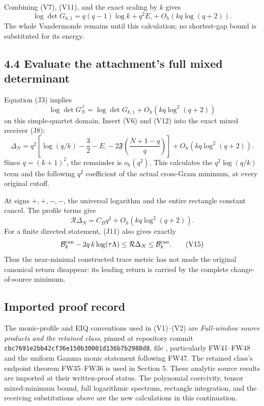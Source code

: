 \documentclass[11pt]{article}
\begin{document}
Combining (V7), (V11), and the exact scaling by \(k\) gives \[
 \log\det G_{k,1}
 =q(q-1)\log k+q^2E_\square+O_h(kq\log(q+2)). \tag{V12}
\] The whole Vandermonde remains until this calculation; no shortest-gap bound is substituted for its energy.

\subsection{4.4 Evaluate the attachment's full mixed determinant}\label{evaluate-the-attachments-full-mixed-determinant}

Equation (J3) implies \[
 \log\det G_N^J
 =\log\det G_{k,1}+O_h(kq\log^2(q+2))
\] on this simple-quartet domain. Insert (V6) and (V12) into the exact mixed receiver (J8): \[
 \boxed{
 \Delta_N
 =q^2\left[
 \log(q/k)-\frac32-E_\square
 -2\mathfrak F\!\left(\frac{N+1-q}{q}\right)
 \right]
 +O_h(kq\log^2(q+2)).
 } \tag{V13}
\] Since \(q=(k+1)^2\), the remainder is \(o_h(q^2)\). This calculates the \(q^2\log(q/k)\) term and the following \(q^2\) coefficient of the actual cross-Gram minimum, at every original cutoff.

At signs \(+,+,-,-\), the universal logarithm and the entire rectangle constant cancel. The profile terms give \[
 \boxed{\mathcal R\Delta_N
 =C_Bq^2+O_h(kq\log^2(q+2)).} \tag{V14}
\] For a finite directed statement, (J11) also gives exactly \[
 \mathcal B_k^{\rm can}-2q\,k\log(\tau\Lambda)
 \le\mathcal R\Delta_N\le\mathcal B_k^{\rm can}. \tag{V15}
\] Thus the near-minimal constructed trace metric has not made the original canonical return disappear: its leading return is carried by the complete change-of-source minimum.

\subsection{Imported proof record}\label{imported-proof-record}

The monic-profile and EIQ conventions used in (V1)--(V2) are \emph{Full-window source products and the retained class}, pinned at repository commit \nolinkurl{cbc7691e2bb42cf36e150b30001d136b7b2988d8}, file , particularly FW41--FW48 and the uniform Gamma monic statement following FW47. The retained class's endpoint theorem FW35--FW36 is used in Section 5. These analytic source results are imported at their written-proof status. The polynomial coercivity, tensor mixed-minimum bound, full logarithmic spectrum, rectangle integration, and the receiving substitutions above are the new calculations in this continuation.
\end{document}
